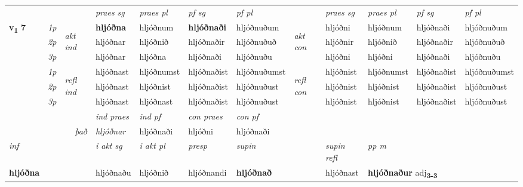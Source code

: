 \begin{longtable}[l]{X>{\footnotesize\itshape}llXXXXlXXXX}
 & &   & \textit{praes sg}  & \textit{praes pl}    & \textit{ pf sg} & \textit{pf pl} & & \textit{praes sg}  & \textit{praes pl}    & \textit{pf sg} & \textit{pf pl }  \\ \cmidrule{4-7} \cmidrule{9-12}
 \multirow{2}{*}{{{\textbf{v{\textsubscript{1}}} \Large{\textbf{7}}}}}  & 1p & \multirow{3}{*}{\begin{turn}{90}\textit{akt ind}\end{turn}} & \textbf{hljóðna} & hljóðnum & \textbf{hljóðnaði} & hljóðnuðum & \multirow{3}{*}{\begin{turn}{90}\textit{akt con}\end{turn}} &hljóðni & hljóðnum & hljóðnaði & hljóðnuðum\\*
 & 2p &  &  hljóðnar  & hljóðnið & hljóðnaðir & hljóðnuðuð & & hljóðnir & hljóðnið & hljóðnaðir & hljóðnuðuð \\*
 & 3p &  & hljóðnar & hljóðna & hljóðnaði & hljóðnuðu & & hljóðni & hljóðni& hljóðnaði & hljóðnuðu \\*
\cmidrule{4-7} \cmidrule{9-12}
 & 1p & \multirow{3}{*}{\begin{turn}{90}\textit{refl ind}\end{turn}}  & hljóðnast & hljóðnumst & hljóðnaðist & hljóðnuðumst & \multirow{3}{*}{\begin{turn}{90}\textit{refl con}\end{turn}}  &hljóðnist & hljóðnumst & hljóðnaðist & hljóðnuðumst \\*
 & 2p &  & hljóðnast & hljóðnist & hljóðnaðist & hljóðnuðust & &hljóðnist & hljóðnist & hljóðnaðist & hljóðnuðust \\*
 & 3p  & & hljóðnast & hljóðnast & hljóðnaðist & hljóðnuðust & & hljóðnist & hljóðnist& hljóðnaðist & hljóðnuðust \\*
\cmidrule{4-7} \cmidrule{9-12}

   && &  \textit{ind praes} & \textit{ind pf} & \textit{con praes} & \textit{con pf} \\*
\multicolumn{3}{r}{\textit{það}} & hljóðnar & hljóðnaði & hljóðni & hljóðnaði \\*

\cmidrule{4-7}
   {\textit{inf}} & &  & \textit{i akt sg} & \textit{i akt pl}   & \textit{presp} & \textit{supin} && \textit{supin refl} & \textit{pp m} \\*
  {\textbf{hljóðna}} & && hljóðnaðu  & hljóðnið   & hljóðnandi &  \textbf{hljóðnað} && hljóðnast & \multicolumn{2}{l}{\textbf{hljóðnaður} adj\textbf{\textsubscript{3-3}}} \\*


\end{longtable}

